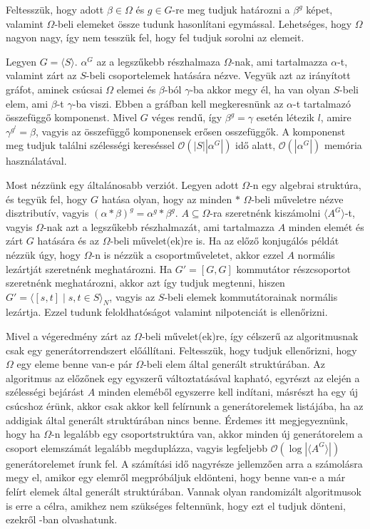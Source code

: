 Feltesszük, hogy adott $\beta\in\Omega$ és $g\in G$-re meg tudjuk határozni a $\beta^g$ képet, valamint $\Omega$-beli
elemeket össze tudunk hasonlítani egymással. Lehetséges, hogy $\Omega$ nagyon nagy, így nem tesszük fel, hogy fel tudjuk sorolni az elemeit.

Legyen $G=\langle S\rangle$. $\alpha^G$ az a legszűkebb részhalmaza $\Omega$-nak, ami tartalmazza $\alpha$-t, valamint zárt az $S$-beli csoportelemek hatására nézve.
Vegyük azt az irányított gráfot, aminek csúcsai $\Omega$ elemei és $\beta$-ból $\gamma$-ba akkor megy él, ha van olyan $S$-beli elem, ami $\beta$-t $\gamma$-ba viszi.
Ebben a gráfban kell megkeresnünk az $\alpha$-t tartalmazó összefüggő komponenst.
Mivel $G$ véges rendű, így $\beta^g=\gamma$ esetén létezik $l$, amire $\gamma^{g^l}=\beta$, vagyis az összefüggő komponensek erősen osszefüggők.
A komponenst meg tudjuk találni szélességi kereséssel $\mathcal{O}(|S| |\alpha^G|)$ idő alatt, $\mathcal{O}(|\alpha^G|)$ memória használatával.

Most nézzünk egy általánosabb verziót.
Legyen adott $\Omega$-n egy algebrai struktúra, és tegyük fel, hogy $G$ hatása olyan, hogy az minden $*$ $\Omega$-beli műveletre nézve disztributív,
vagyis $(\alpha * \beta)^g = \alpha^g * \beta^g$.
$A \subseteq \Omega$-ra szeretnénk kiszámolni $\langle A^G \rangle$-t, vagyis
$\Omega$-nak azt a legszűkebb részhalmazát, ami tartalmazza $A$ minden elemét és zárt $G$ hatására és az $\Omega$-beli művelet(ek)re is.
Ha az előző konjugálós példát nézzük úgy, hogy $\Omega$-n is nézzük a csoportműveletet, akkor ezzel $A$ normális lezártját szeretnénk meghatározni.
Ha $G'=[G,G]$ kommutátor részcsoportot szeretnénk meghatározni,
akkor azt így tudjuk megtenni, hiszen $G'=\langle[s,t] \mid s,t \in S\rangle_N$, vagyis az $S$-beli elemek kommutátorainak normális lezártja.
Ezzel tudunk feloldhatóságot valamint nilpotenciát is ellenőrizni.

Mivel a végeredmény zárt az $\Omega$-beli művelet(ek)re, így célszerű az algoritmusnak csak egy generátorrendszert előállítani.
Feltesszük, hogy tudjuk ellenőrizni, hogy $\Omega$ egy eleme benne van-e pár $\Omega$-beli elem által generált struktúrában.
Az algoritmus az előzőnek egy egyszerű változtatásával kapható, egyrészt az elején a szélességi bejárást $A$ minden eleméből egyszerre kell indítani,
másrészt ha egy új csúcshoz érünk, akkor csak akkor kell felírnunk a generátorelemek listájába, ha az addigiak által generált struktúrában nincs benne.
Érdemes itt megjegyeznünk, hogy ha $\Omega$-n legalább egy csoportstruktúra van, akkor minden új generátorelem a csoport elemszámát legalább megduplázza,
vagyis legfeljebb $\mathcal{O}(\log|\langle A^G\rangle |)$ generátorelemet írunk fel. A számítási idő nagyrésze jellemzően arra a számolásra megy el, amikor egy elemről
megpróbáljuk eldönteni, hogy benne van-e a már felírt elemek által generált struktúrában. Vannak olyan randomizált algoritmusok is erre a célra, amikhez nem szükséges feltennünk,
hogy ezt el tudjuk dönteni, ezekről \cite{Ser03}-ban olvashatunk.

